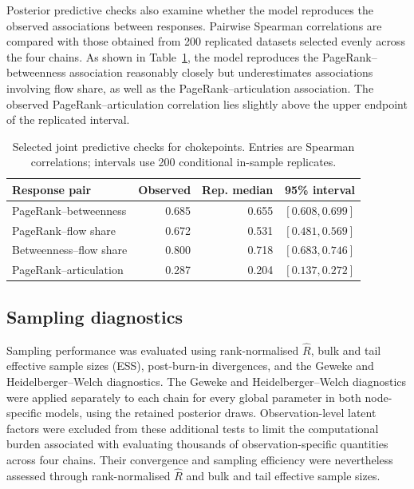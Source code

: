 \documentclass[pdftex,12pt,openright,a4paper,oneside]{book}
\begin{document}
Posterior predictive checks also examine whether the model reproduces the observed associations between responses. Pairwise Spearman correlations are compared with those obtained from 200 replicated datasets selected evenly across the four chains. As shown in Table~\ref{tab:chokepoint_joint_ppc}, the model reproduces the PageRank--betweenness association reasonably closely but underestimates associations involving flow share, as well as the PageRank--articulation association. The observed PageRank--articulation correlation lies slightly above the upper endpoint of the replicated interval.

\begin{table}[htbp]
\centering
\small
\caption{Selected joint predictive checks for chokepoints. Entries are Spearman correlations; intervals use 200 conditional in-sample replicates.}
\label{tab:chokepoint_joint_ppc}
\begin{tabular}{lrrr}
\hline
Response pair & Observed & Rep. median & 95\% interval \\
\hline
PageRank--betweenness & 0.685 & 0.655 & $[0.608,0.699]$ \\
PageRank--flow share & 0.672 & 0.531 & $[0.481,0.569]$ \\
Betweenness--flow share & 0.800 & 0.718 & $[0.683,0.746]$ \\
PageRank--articulation & 0.287 & 0.204 & $[0.137,0.272]$ \\
\hline
\end{tabular}
\end{table}


\subsection{Sampling diagnostics}
\label{subsec:baseline_sampling_diagnostics}

Sampling performance was evaluated using rank-normalised
$\widehat{R}$, bulk and tail effective sample sizes (ESS),
post-burn-in divergences, and the Geweke and Heidelberger--Welch diagnostics. 
The Geweke and Heidelberger--Welch diagnostics were applied separately to each chain for every global parameter in both node-specific models, 
using the retained posterior draws.
Observation-level latent factors were excluded from these additional tests 
to limit the computational burden associated with evaluating thousands of observation-specific 
quantities across four chains. Their convergence and sampling efficiency were nevertheless 
assessed through rank-normalised $\widehat{R}$ and bulk and tail effective sample sizes.
\end{document}
